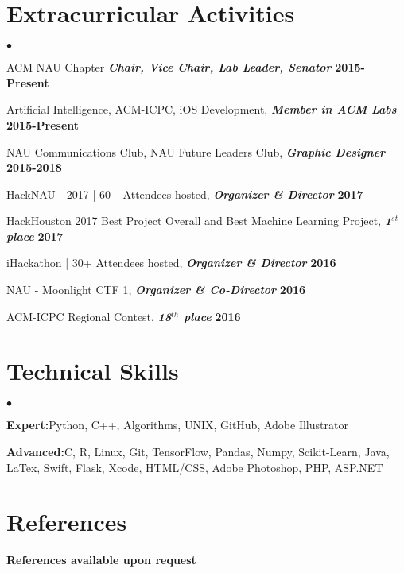 \documentclass[margin,line]{res}
\newenvironment{list2}{
  \begin{list}{$\bullet$}{%
      \setlength{\itemsep}{0in}
      \setlength{\parsep}{0in} \setlength{\parskip}{0in}
      \setlength{\topsep}{0in} \setlength{\partopsep}{0in} 
      \setlength{\leftmargin}{0.2in}}}{\end{list}}
\begin{document}
\begin{resume}
\section{\sc Extracurricular Activities}
\begin{list2}
\item ACM NAU Chapter {\em \textbf{Chair, Vice Chair, Lab Leader, Senator}} \hfill {\bf 2015-Present}
\item Artificial Intelligence, ACM-ICPC, iOS Development, {\em \textbf{Member in ACM Labs}} \hfill {\bf 2015-Present}
\item NAU Communications Club, NAU Future Leaders Club, {\em \textbf{Graphic Designer}} \hfill  {\bf 2015-2018}
\item HackNAU - 2017 | 60+ Attendees hosted, {\em \textbf{Organizer \& Director}} \hfill {\bf 2017}
\item HackHouston 2017 Best Project Overall and Best Machine Learning Project, {\em \textbf{1$^{st}$ place}} \hfill  {\bf 2017}
\item iHackathon | 30+ Attendees hosted, {\em \textbf{Organizer \& Director}} \hfill {\bf 2016} 
\item NAU - Moonlight CTF 1, {\em \textbf{Organizer \& Co-Director}} \hfill {\bf 2016}
\item ACM-ICPC Regional Contest, {\em \textbf{18$^{th}$ place}} \hfill  {\bf 2016}
\end{list2}

\section{\sc Technical Skills} 
\begin{list2}
\item{\textbf{Expert:}\space Python, C++, Algorithms, UNIX, GitHub, Adobe Illustrator}
\item{\textbf{Advanced:}\space C, R, Linux, Git, TensorFlow, Pandas, Numpy, Scikit-Learn, Java, LaTex, Swift, Flask, Xcode, HTML/CSS, Adobe Photoshop, PHP, ASP.NET}
\end{list2}

\section{\sc References} 
{\bf References available upon request}


\end{resume}
\end{document}
